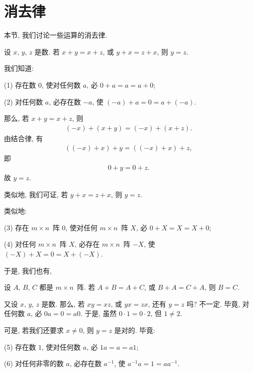 \section{消去律}

本节, 我们讨论一些运算的消去律.

\begin{theorem}
    设 \(x\), \(y\), \(z\) 是数.
    若 \(x + y = x + z\), 或 \(y + x = z + x\),
    则 \(y = z\).
\end{theorem}

我们知道:

(1)
存在数 \(0\), 使对任何数 \(a\), 必 \(0 + a = a = a + 0\);

(2)
对任何数 \(a\), 必存在数 \(-a\), 使 \((-a) + a = 0 = a + (-a)\).

那么, 若 \(x + y = x + z\),
则
\begin{align*}
    (-x) + (x + y) = (-x) + (x + z).
\end{align*}
由结合律, 有
\begin{align*}
    ((-x) + x) + y = ((-x) + x) + z,
\end{align*}
即
\begin{align*}
    0 + y = 0 + z.
\end{align*}
故 \(y = z\).

类似地, 我们可证,
若 \(y + x = z + x\), 则 \(y = z\).

类似地:

(3)
存在 \(m \times n\)~阵 \(0\),
使对任何 \(m \times n\)~阵 \(X\),
必 \(0 + X = X = X + 0\);

(4)
对任何 \(m \times n\)~阵 \(X\),
必存在 \(m \times n\)~阵 \(-X\),
使 \((-X) + X = 0 = X + (-X)\).

于是, 我们也有,

\begin{theorem}
    设 \(A\), \(B\), \(C\) 都是 \(m \times n\)~阵.
    若 \(A + B = A + C\), 或 \(B + A = C + A\),
    则 \(B = C\).
\end{theorem}

又设 \(x\), \(y\), \(z\) 是数.
那么, 若 \(xy = xz\), 或 \(yx = zx\),
还有 \(y = z\) 吗?
不一定.
毕竟, 对任何数 \(a\), 必 \(0a = 0 = a0\).
于是, 虽然 \(0 \cdot 1 = 0 \cdot 2\),
但 \(1 \neq 2\).

可是, 若我们还要求 \(x \neq 0\), 则 \(y = z\) 是对的.
毕竟:

(5)
存在数 \(1\), 使对任何数 \(a\), 必 \(1a = a = a1\);

(6)
对任何非零的数 \(a\), 必存在数 \(a^{-1}\), 使 \(a^{-1} a = 1 = a a^{-1}\).

